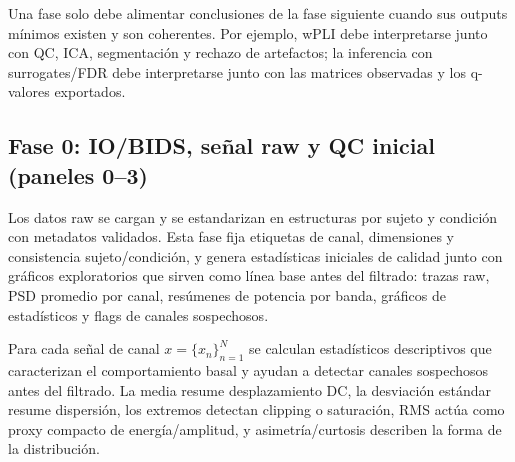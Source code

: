 \begin{controlqc}
Una fase solo debe alimentar conclusiones de la fase siguiente cuando sus outputs mínimos existen y son coherentes. Por ejemplo, wPLI debe interpretarse junto con QC, ICA, segmentación y rechazo de artefactos; la inferencia con surrogates/FDR debe interpretarse junto con las matrices observadas y los q-valores exportados.
\end{controlqc}

\subsection{Fase 0: IO/BIDS, señal raw y QC inicial (paneles 0--3)}

Los datos raw se cargan y se estandarizan en estructuras por sujeto y condición con metadatos validados. Esta fase fija etiquetas de canal, dimensiones y consistencia sujeto/condición, y genera estadísticas iniciales de calidad junto con gráficos exploratorios que sirven como línea base antes del filtrado: trazas raw, PSD promedio por canal, resúmenes de potencia por banda, gráficos de estadísticos y flags de canales sospechosos.

Para cada señal de canal $x=\{x_n\}_{n=1}^{N}$ se calculan estadísticos descriptivos que caracterizan el comportamiento basal y ayudan a detectar canales sospechosos antes del filtrado. La media resume desplazamiento DC, la desviación estándar resume dispersión, los extremos detectan clipping o saturación, RMS actúa como proxy compacto de energía/amplitud, y asimetría/curtosis describen la forma de la distribución.

